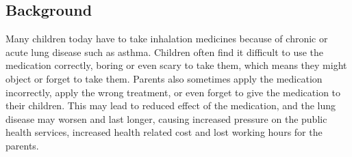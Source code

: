 \subsection{Background}

Many children today have to take inhalation medicines because of chronic or
acute lung disease such as asthma. Children often find it difficult to use
the medication correctly, boring or even scary to take them, which means they
might object or forget to take them. Parents also sometimes
apply the medication incorrectly, apply the wrong treatment, or even forget to
give the medication to their
children. This may lead to reduced effect of the medication, and the lung disease
may worsen and last longer, causing increased pressure on the public health
services, increased health related cost and lost working hours for the parents.


